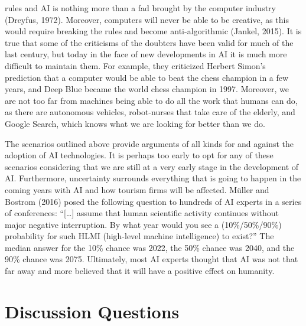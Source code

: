 \documentclass[
  letterpaper,
  DIV=11,
  numbers=noendperiod]{scrreprt}
\begin{document}
\begin{itemize}
  rules and AI is nothing more than a fad brought by the computer
  industry (Dreyfus, 1972). Moreover, computers will never be able to be
  creative, as this would require breaking the rules and become
  anti-algorithmic (Jankel, 2015). It is true that some of the
  criticisms of the doubters have been valid for much of the last
  century, but today in the face of new developments in AI it is much
  more difficult to maintain them. For example, they criticized Herbert
  Simon's prediction that a computer would be able to beat the chess
  champion in a few years, and Deep Blue became the world chess champion
  in 1997. Moreover, we are not too far from machines being able to do
  all the work that humans can do, as there are autonomous vehicles,
  robot-nurses that take care of the elderly, and Google Search, which
  knows what we are looking for better than we do.
\end{itemize}

The scenarios outlined above provide arguments of all kinds for and
against the adoption of AI technologies. It is perhaps too early to opt
for any of these scenarios considering that we are still at a very early
stage in the development of AI. Furthermore, uncertainty surrounds
everything that is going to happen in the coming years with AI and how
tourism firms will be affected. Müller and Bostrom (2016) posed the
following question to hundreds of AI experts in a series of conferences:
``{[}\ldots{]} assume that human scientific activity continues without
major negative interruption. By what year would you see a
(10\%/50\%/90\%) probability for such HLMI (high-level machine
intelligence) to exist?'' The median answer for the 10\% chance was
2022, the 50\% chance was 2040, and the 90\% chance was 2075.
Ultimately, most AI experts thought that AI was not that far away and
more believed that it will have a positive effect on humanity.

\hypertarget{discussion-questions-7}{%
\section{Discussion Questions}\label{discussion-questions-7}}
\end{document}
